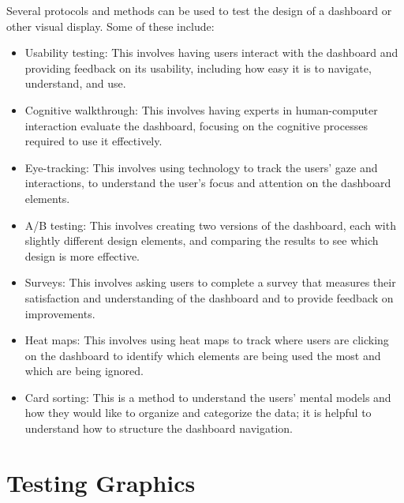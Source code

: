\documentclass[print]{nuthesis}
\providecommand{\tightlist}{%
  \setlength{\itemsep}{0pt}\setlength{\parskip}{0pt}}
\begin{document}
Several protocols and methods can be used to test the design of a dashboard or other visual display.
Some of these include:

\begin{itemize}
\tightlist
\item
  Usability testing: This involves having users interact with the dashboard and providing feedback on its usability, including how easy it is to navigate, understand, and use.
\item
  Cognitive walkthrough: This involves having experts in human-computer interaction evaluate the dashboard, focusing on the cognitive processes required to use it effectively.
\item
  Eye-tracking: This involves using technology to track the users' gaze and interactions, to understand the user's focus and attention on the dashboard elements.
\item
  A/B testing: This involves creating two versions of the dashboard, each with slightly different design elements, and comparing the results to see which design is more effective.
\item
  Surveys: This involves asking users to complete a survey that measures their satisfaction and understanding of the dashboard and to provide feedback on improvements.
\item
  Heat maps: This involves using heat maps to track where users are clicking on the dashboard to identify which elements are being used the most and which are being ignored.
\item
  Card sorting: This is a method to understand the users' mental models and how they would like to organize and categorize the data; it is helpful to understand how to structure the dashboard navigation.
\end{itemize}

\hypertarget{testing-graphics}{%
\chapter{Testing Graphics}\label{testing-graphics}}

\end{document}
